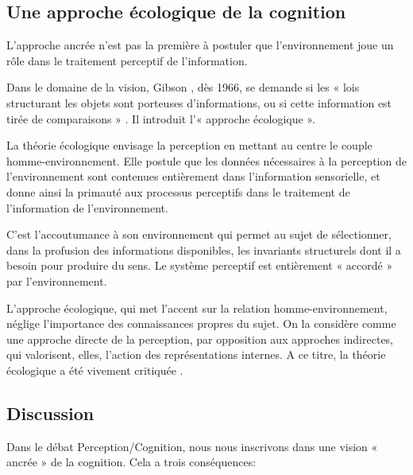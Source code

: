 \subsection{Une approche écologique de la cognition}
\label{sec:ch3_ecologiqueCognition}

L'approche ancrée n'est pas la première à postuler que l'environnement joue un rôle dans le traitement perceptif de l'information.

Dans le domaine de la vision, Gibson \citep{gibson1966senses}, dès 1966, se demande si les « lois structurant les objets sont porteuses d'informations, ou si cette information est tirée de comparaisons  » \citep{gibson1978ecological}. Il introduit l'« approche écologique ». 

La théorie écologique envisage la perception en mettant au centre le couple homme-environnement. Elle postule que les données nécessaires à la perception de l'environnement sont contenues entièrement dans l'information sensorielle, et donne ainsi la primauté aux processus perceptifs dans le traitement de l'information de l'environnement.

C'est l'accoutumance à son environnement qui permet au sujet de sélectionner, dans la profusion des informations disponibles, les invariants structurels dont il a besoin pour produire du sens. Le système perceptif est entièrement « accordé » par l'environnement.

L'approche écologique, qui met l'accent sur la relation homme-environnement, néglige l'importance des connaissances propres du sujet. On la considère comme une approche directe de la perception, par opposition aux approches indirectes, qui valorisent, elles, l'action des représentations internes. A ce titre, la théorie écologique a été vivement critiquée \citep{ullman1980against}.

\subsection{Discussion}
\label{sec:ch3_groundedCogDiscussion}

Dans le débat Perception/Cognition, nous nous inscrivons dans une vision « ancrée » de la cognition. Cela a trois conséquences:

